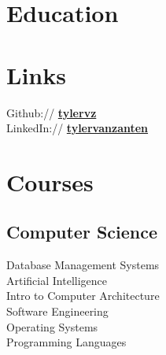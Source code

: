 \documentclass[letterpaper]{deedy-resume} %
\begin{document}
\begin{minipage}[t]{0.33\textwidth} %


\section{Education} 


\sectionspace %


\section{Links} 

Github:// \href{https://github.com/tylervz}{\bf tylervz} \\
LinkedIn:// \href{https://www.linkedin.com/in/tylervanzanten}{\bf tylervanzanten}

\sectionspace %


\section{Courses}

\subsection{Computer Science}

Database Management Systems \\
Artificial Intelligence \\
Intro to Computer Architecture \\
Software Engineering \\
Operating Systems \\
Programming Languages


\end{minipage}
\end{document}
